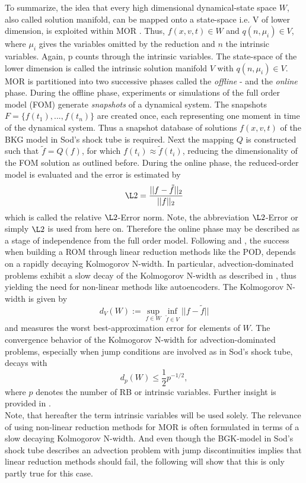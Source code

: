 To summarize, the idea that every high dimensional dynamical-state space \(W\), also called solution
manifold, can be mapped onto a state-space i.e. V of lower dimension, is exploited within MOR \cite{ohlberger2015reduced}. Thus, \(f(x, v, t) \in W\) and \(q(n,\mu_i) \in V\), where \(\mu_i\) gives the variables omitted by the reduction and \(n\) the intrinsic variables. Again, p counts through the intrinsic variables. The state-space of the lower dimension is called the intrinsic solution manifold \(V\) with \(q(n, \mu_i) \in V\)\cite{Carlberg}.
MOR is partitioned into two successive phases called the \textit{offline} - and the \textit{online} phase. During the offline phase, experiments or simulations of the full order model (FOM) generate \textit{snapshots} of a dynamical system. The snapshots \(F = \{f(t_1),...,f(t_n)\}\) are created once, each representing one moment in time of the dynamical system. Thus a snapshot database of solutions \(f(x,v,t)\) of the BKG model in Sod's shock tube is required. Next the mapping \(Q\) is constructed such that \(\tilde{f} = Q(f)\), for which \(f(t_i) \approx \tilde{f}(t_i)\), reducing the dimensionality of the FOM solution as outlined before. During the online phase, the reduced-order model is evaluated and the error is estimated by
\begin{equation}
	\L2 = \frac{||f - \tilde{f} ||_2}{||f||_2}
\end{equation}
which is called the relative \(\L2\)-Error norm. Note, the abbreviation \(\L2\)-Error or simply \(\L2\) is used from here on. Therefore the online phase may be described as a stage of independence from the full order model. Following \cite{ohlberger2015reduced} and \cite{Carlberg}, the success when building a ROM through linear reduction methods like the POD, depends on a rapidly decaying Kolmogorov N-width. In particular, advection-dominated problems exhibit a slow decay of the Kolmogorov N-width as described in \cite{ohlberger2015reduced}, thus yielding the need for non-linear methods like autoencoders. The Kolmogorov N-width is given by
\begin{equation}
	d_{V}(W):= \sup_{f \in W} \inf_{\tilde{f} \in V} ||f-\tilde{f}||
	\label{Eq:Kolmogorov}
\end{equation}
and measures the worst best-approximation error for elements of \(W\). The convergence behavior of the Kolmogorov N-width for advection-dominated problems, especially when jump conditions are involved as in Sod's shock tube, decays with
\begin{equation}
	d_p(W) \leq \frac{1}{2} p^{-1/2},
	\label{Eq:KolmoAdv}
\end{equation}
where \(p\) denotes the number of RB or intrinsic variables. Further insight is provided in \cite{ohlberger2015reduced}.\\
Note, that hereafter the term intrinsic variables will be used solely. The relevance of using non-linear reduction methods for MOR is often formulated in terms of a slow decaying Kolmogorov N-width. And even though the BGK-model in Sod's shock tube describes an advection problem with jump discontinuities implies that linear reduction methods should fail, the following will show that this is only partly true for this case.

